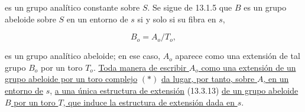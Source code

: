 \noindent
es un grupo analítico constante sobre $S$. Se sigue de 13.1.5 que $B$
es un grupo abeloide sobre $S$ en un entorno de $s$ si y solo si su fibra
en $s$,

\begin{equation*}
 B_o=A_o/T_o,
\end{equation*}

\noindent
es un grupo analítico abeloide; en ese caso, $A_o$ aparece como una
extensión de tal grupo $B_o$ por un toro $T_o$. \underline{Toda manera de
escribir $A_o$ como una extensión de un grupo abeloide por un toro
complejo} $(*)$ \underline{da lugar, por tanto, sobre $A$, en un entorno de} $s$, \underline{a
una única estructura de extensión} (13.3.13) \underline{de un grupo
abeloide $B$ por un toro $T$, que induce la estructura de extensión dada
en $s$}.
